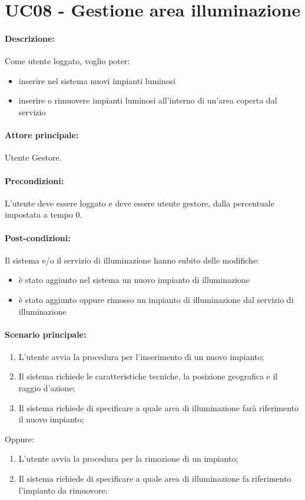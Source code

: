 \section{UC08 - Gestione area illuminazione}

\paragraph{Descrizione:}
Come utente loggato, voglio poter:
\begin{itemize}
    \item inserire nel sistema nuovi impianti luminosi
    \item inserire o rimuovere impianti luminosi all'interno di un'area coperta dal servizio
\end{itemize}


\paragraph{Attore principale:}
Utente Gestore.

\paragraph{Precondizioni:}
L'utente deve essere loggato e deve essere utente gestore, dalla percentuale impostata a tempo 0.

\paragraph{Post-condizioni:}
Il sistema e/o il servizio di illuminazione hanno subito delle modifiche:
\begin{itemize}
    \item è stato aggiunto nel sistema un nuovo impianto di illuminazione 
    \item è stato aggiunto oppure rimosso un impianto di illuminazione dal servizio di illuminazione
\end{itemize}

\paragraph{Scenario principale:}
\begin{enumerate}
    \item L’utente avvia la procedura per l’inserimento di un nuovo impianto;
    \item Il sistema richiede le caratteristiche tecniche, la posizione geografica e il raggio d'azione;
    \item Il sistema richiede di specificare a quale area di illuminazione farà riferimento il nuovo impianto;
\end{enumerate}
Oppure:
\begin{enumerate}
    \item L’utente avvia la procedura per la rimozione di un impianto;
    \item Il sistema richiede di specificare a quale area di illuminazione fa riferimento l'impianto da rimuovore;
\end{enumerate}

